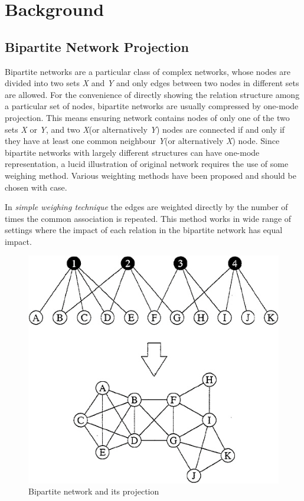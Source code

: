 \chapter{Background}

\section{Bipartite Network Projection}

Bipartite networks are a particular class of complex networks, whose nodes are divided into two sets \emph{X} and \emph{Y} and only edges between two nodes in different sets are allowed. For the convenience of directly showing the relation structure among a particular set of nodes, bipartite networks are usually compressed by one-mode projection. This means ensuring network contains nodes of only one of the two sets \emph{X} or \emph{Y}, and two \emph{X}(or alternatively \emph{Y}) nodes are connected if and only if they have at least one common neighbour \emph{Y}(or alternatively \emph{X}) node. Since bipartite networks with largely different structures can have one-mode representation, a lucid illustration of original network requires the use of some weighing method. Various weighting methods have been proposed and should be chosen with case.

In \emph{simple weighing technique} the edges are weighted directly by the number of times the common association is repeated. This method works in wide range of settings where the impact of each relation in the bipartite network has equal impact.

\begin{figure}[htb]
\centering
\includegraphics[scale=0.3]{bipartite} %
\caption{Bipartite network and its projection}
\label{fig:label} %
\end{figure}

